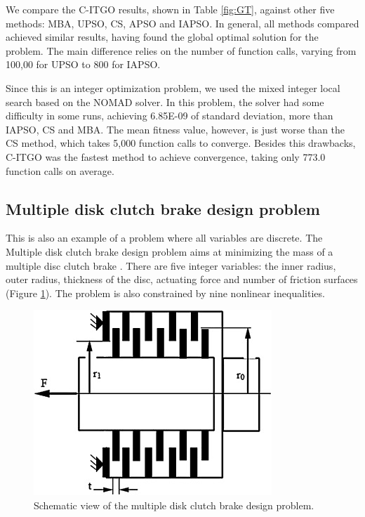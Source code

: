 We compare the C-ITGO results, shown in Table \ref{fig:GT}, against other five methods: MBA, UPSO, CS, APSO and IAPSO. In general, all methods compared achieved similar results, having found the global optimal solution for the problem. The main difference relies on the number of function calls, varying from 100,00 for UPSO to 800 for IAPSO.




Since this is an integer optimization problem, we used the mixed integer local search based on the NOMAD solver. In this problem, the solver had some difficulty in some runs, achieving 6.85E-09 of standard deviation, more than IAPSO, CS and MBA. The mean fitness value, however, is just worse than the CS method, which takes 5,000 function calls to converge. Besides this drawbacks, C-ITGO was the fastest method to achieve convergence, taking only 773.0 function calls on average.



\subsection{Multiple disk clutch brake design problem}

This is also an example of a problem where all variables are discrete. The Multiple disk clutch brake design problem aims at minimizing the mass of a multiple disc clutch brake \cite{MD}. There are five integer variables: the inner radius, outer radius, thickness of the disc, actuating force and number of friction surfaces (Figure \ref{fig:MD}). The problem is also constrained by nine nonlinear inequalities.

\begin{figure}[h]
\begin{center}
\includegraphics[scale=0.6]{Imgs/MD.jpg}
\end{center}
\captionsetup{justification=centering}
\caption{Schematic view of the multiple disk clutch brake design problem.}\label{fig:MD}
\end{figure}

